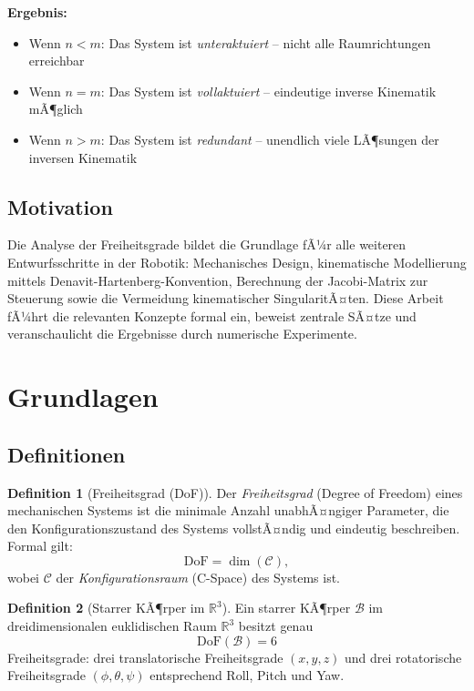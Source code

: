 ﻿\documentclass[a4paper,12pt]{article}
\theoremstyle{definition}
\newtheorem{definition}{Definition}
\begin{document}
\textbf{Ergebnis:}
\begin{itemize}
	\item Wenn $n < m$: Das System ist \emph{unteraktuiert} -- nicht alle Raumrichtungen erreichbar
	\item Wenn $n = m$: Das System ist \emph{vollaktuiert} -- eindeutige inverse Kinematik mÃ¶glich
	\item Wenn $n > m$: Das System ist \emph{redundant} -- unendlich viele LÃ¶sungen der inversen Kinematik
\end{itemize}

\subsection{Motivation}

Die Analyse der Freiheitsgrade bildet die Grundlage fÃ¼r alle weiteren Entwurfsschritte in der Robotik: Mechanisches Design, kinematische Modellierung mittels Denavit-Hartenberg-Konvention, Berechnung der Jacobi-Matrix zur Steuerung sowie die Vermeidung kinematischer SingularitÃ¤ten. Diese Arbeit fÃ¼hrt die relevanten Konzepte formal ein, beweist zentrale SÃ¤tze und veranschaulicht die Ergebnisse durch numerische Experimente.

\section{Grundlagen}

\subsection{Definitionen}

\begin{definition}[Freiheitsgrad (DoF)]
	Der \emph{Freiheitsgrad} (Degree of Freedom) eines mechanischen Systems ist die minimale Anzahl unabhÃ¤ngiger Parameter, die den Konfigurationszustand des Systems vollstÃ¤ndig und eindeutig beschreiben. Formal gilt:
	\[
		\text{DoF} = \dim(\mathcal{C}),
	\]
	wobei $\mathcal{C}$ der \emph{Konfigurationsraum} (C-Space) des Systems ist.
\end{definition}

\begin{definition}[Starrer KÃ¶rper im $\mathbb{R}^3$]
	Ein starrer KÃ¶rper $\mathcal{B}$ im dreidimensionalen euklidischen Raum $\mathbb{R}^3$ besitzt genau
	\[
		\text{DoF}(\mathcal{B}) = 6
	\]
	Freiheitsgrade: drei translatorische Freiheitsgrade $(x, y, z)$ und drei rotatorische Freiheitsgrade $(\phi, \theta, \psi)$ entsprechend Roll, Pitch und Yaw.
\end{definition}
\end{document}
